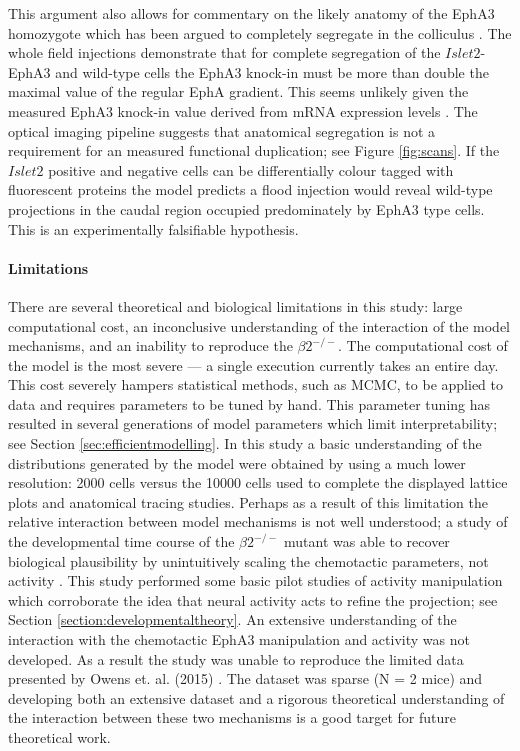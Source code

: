 This argument also allows for commentary on the likely anatomy of the EphA3 homozygote which has been argued to completely segregate in the colliculus \cite{Cang2013-dw}. The whole field injections demonstrate that for complete segregation of the $Islet2$-EphA3 and wild-type cells the EphA3 knock-in must be more than double the maximal value of the regular EphA gradient. This seems unlikely given the measured EphA3 knock-in value derived from mRNA expression levels \cite{Reber2004-wq}. The optical imaging pipeline suggests that anatomical segregation is not a requirement for an measured functional duplication; see Figure \ref{fig:scans}. If the $Islet2$ positive and negative cells can be differentially colour tagged with fluorescent proteins the model predicts a flood injection would reveal wild-type projections in the caudal region occupied predominately by EphA3 type cells. This is an experimentally falsifiable hypothesis.
\paragraph{Limitations}
There are several theoretical and biological limitations in this study: large computational cost, an inconclusive understanding of the interaction of the model mechanisms, and an inability to reproduce the $\beta2^{-/-}$. The computational cost of the model is the most severe --- a single execution currently takes an entire day. This cost severely hampers statistical methods, such as MCMC, to be applied to data and requires parameters to be tuned by hand. This parameter tuning has resulted in several generations of model parameters which limit interpretability; see Section \ref{sec:efficientmodelling}. In this study a basic understanding of the distributions generated by the model were obtained by using a much lower resolution: 2000 cells versus the 10000 cells used to complete the displayed lattice plots and anatomical tracing studies. Perhaps as a result of this limitation the relative interaction between model mechanisms is not well understood; a study of the developmental time course of the $\beta2^{-/-}$ mutant was able to recover biological plausibility by unintuitively scaling the chemotactic parameters, not activity \cite{Lyngholm2019-fs}. This study performed some basic pilot studies of activity manipulation which corroborate the idea that neural activity acts to refine the projection; see Section \ref{section:developmentaltheory}. An extensive understanding of the interaction with the chemotactic EphA3 manipulation and activity was not developed. As a result the study was unable to reproduce the limited data presented by Owens et. al. (2015) \cite{Owens2015-zv}. The dataset was sparse (N = 2 mice) and developing both an extensive dataset and a rigorous theoretical understanding of the interaction between these two mechanisms is a good target for future theoretical work.
